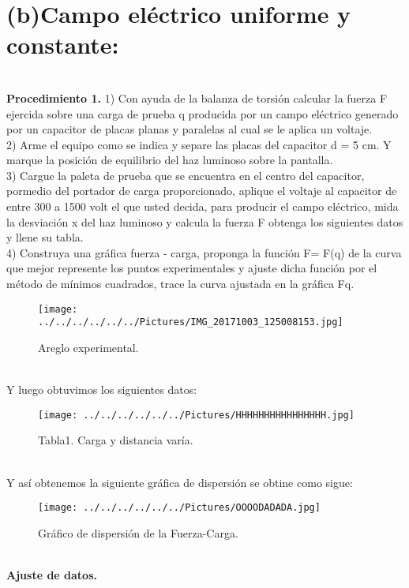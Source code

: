 \documentclass[11pt,a4paper]{article}
\begin{document}
\section*{(b)Campo el\'{e}ctrico uniforme y constante:}\\
\textbf{Procedimiento 1.}
1) Con ayuda de la balanza de torsi\'{o}n calcular la fuerza F ejercida sobre una carga de prueba q producida por un campo el\'{e}ctrico generado por un capacitor de placas planas y paralelas al cual se le aplica un voltaje.\\
2) Arme el equipo como se indica y separe las placas del capacitor d = 5 cm. Y marque la posici\'{o}n de equilibrio del haz luminoso sobre la pantalla.\\
3) Cargue la paleta de prueba que se encuentra en el centro del capacitor, pormedio del portador de carga proporcionado, aplique el voltaje al capacitor de entre 300 a 1500 volt el que usted decida, para producir el campo el\'{e}ctrico, mida la desviaci\'{o}n x del haz luminoso y calcula la fuerza F obtenga los siguientes datos y llene su tabla.\\
4) Construya una gr\'{a}fica fuerza - carga, proponga la funci\'{o}n F= F(q) de la curva que mejor represente los puntos experimentales y ajuste dicha funci\'{o}n por el m\'{e}todo de m\'{i}nimos cuadrados, trace la curva ajustada en la gr\'{a}fica Fq.
\\
\begin{figure}[hbtp]
\centering
\texttt{[image: ../../../../../../Pictures/IMG\_20171003\_125008153.jpg]} 
\caption{Areglo experimental.}
\end{figure}
\\
Y luego obtuvimos los siguientes datos:
\begin{figure}[hbtp]
\centering
\texttt{[image: ../../../../../../Pictures/HHHHHHHHHHHHHHHH.jpg]} 
\caption{Tabla1. Carga y distancia var\'{i}a.}
\end{figure}
\\
Y as\'{i} obtenemos la siguiente gr\'{a}fica de dispersi\'{o}n se obtine como sigue:
\begin{figure}[hbtp]
\centering
\texttt{[image: ../../../../../../Pictures/OOOODADADA.jpg]} 
\caption{Gr\'{a}fico de dispersi\'{o}n de la Fuerza-Carga.}
\end{figure}
\\
\textbf{Ajuste de datos.} 
\end{document}
